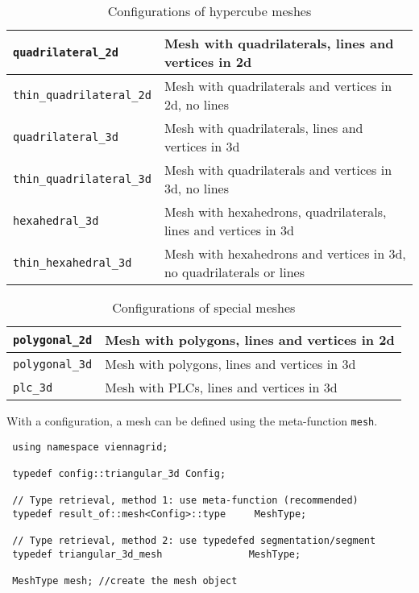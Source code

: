 \begin{table}[tb]
  \begin{center}
    \begin{tabular}{|l|l|}
      \hline
      \lstinline|quadrilateral_2d|        &  Mesh with quadrilaterals, lines and vertices in 2d  \\
      \hline
      \lstinline|thin_quadrilateral_2d|   &  Mesh with quadrilaterals and vertices in 2d, no lines  \\
      \hline
      \lstinline|quadrilateral_3d|        &  Mesh with quadrilaterals, lines and vertices in 3d  \\
      \hline
      \lstinline|thin_quadrilateral_3d|   &  Mesh with quadrilaterals and vertices in 3d, no lines  \\
      \hline
      \lstinline|hexahedral_3d|           &  Mesh with hexahedrons, quadrilaterals, lines and vertices in 3d  \\
      \hline
      \lstinline|thin_hexahedral_3d|      &  Mesh with hexahedrons and vertices in 3d, no quadrilaterals or lines  \\
      \hline
    \end{tabular}
    \caption{Configurations of hypercube meshes}
    \label{tab:configs-hypercube}
  \end{center}
\end{table}


\begin{table}[tb]
  \begin{center}
    \begin{tabular}{|l|l|}
      \hline
      \lstinline|polygonal_2d|   &  Mesh with polygons, lines and vertices in 2d  \\
      \hline
      \lstinline|polygonal_3d|   &  Mesh with polygons, lines and vertices in 3d  \\
      \hline
      \lstinline|plc_3d|   &  Mesh with PLCs, lines and vertices in 3d  \\
      \hline
    \end{tabular}
    \caption{Configurations of special meshes}
    \label{tab:configs-special}
  \end{center}
\end{table}

\pagebreak

With a configuration, a mesh can be defined using the meta-function \lstinline|mesh|.

\begin{lstlisting}
 using namespace viennagrid;

 typedef config::triangular_3d Config;

 // Type retrieval, method 1: use meta-function (recommended)
 typedef result_of::mesh<Config>::type     MeshType;

 // Type retrieval, method 2: use typedefed segmentation/segment
 typedef triangular_3d_mesh               MeshType;

 MeshType mesh; //create the mesh object
\end{lstlisting}

